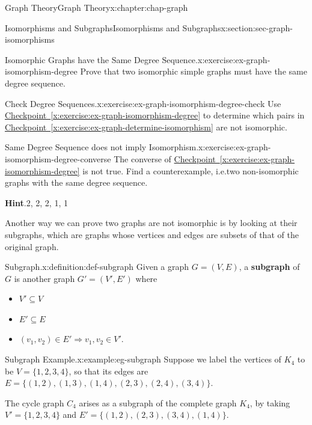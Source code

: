 \documentclass[oneside,10pt,]{book}
\newcommand{\blocktitlefont}{\relax}
\newcommand{\xreffont}{\relax}
\newcommand{\terminology}[1]{\textbf{#1}}
\numberwithin{equation}{section}
\begin{document}
\begin{chapterptx}{Graph Theory}{}{Graph Theory}{}{}{x:chapter:chap-graph}
\begin{sectionptx}{Isomorphisms and Subgraphs}{}{Isomorphisms and Subgraphs}{}{}{x:section:sec-graph-isomorphisms}
\begin{inlineexercise}{Isomorphic Graphs have the Same Degree Sequence.}{x:exercise:ex-graph-isomorphism-degree}
Prove that two isomorphic simple graphs must have the same degree sequence.%
\end{inlineexercise}
\begin{inlineexercise}{Check Degree Sequences.}{x:exercise:ex-graph-isomorphism-degree-check}%
Use \hyperref[x:exercise:ex-graph-isomorphism-degree]{Checkpoint~{\xreffont\ref{x:exercise:ex-graph-isomorphism-degree}}} to determine which pairs in \hyperref[x:exercise:ex-graph-determine-isomorphism]{Checkpoint~{\xreffont\ref{x:exercise:ex-graph-determine-isomorphism}}} are not isomorphic.%
\end{inlineexercise}
\begin{inlineexercise}{Same Degree Sequence does not imply Isomorphism.}{x:exercise:ex-graph-isomorphism-degree-converse}%
The converse of \hyperref[x:exercise:ex-graph-isomorphism-degree]{Checkpoint~{\xreffont\ref{x:exercise:ex-graph-isomorphism-degree}}} is not true. Find a counterexample, i.e.\@ two non-isomorphic graphs with the same degree sequence.%
\par\smallskip%
\noindent\textbf{\blocktitlefont Hint}.\hypertarget{g:hint:id490080}{}\quad{}2, 2, 2, 1, 1%
\end{inlineexercise}
Another way we can prove two graphs are not isomorphic is by looking at their subgraphs, which are graphs whose vertices and edges are subsets of that of the original graph.%
\begin{definition}{Subgraph.}{x:definition:def-subgraph}%
Given a graph \(G = (V,E)\), a \terminology{subgraph} of \(G\) is another graph \(G' = (V', E')\) where%
\begin{itemize}[label=\textbullet]
\item{}\(\displaystyle V' \subseteq V\)%
\item{}\(\displaystyle E' \subseteq E\)%
\item{}\((v_1,v_2) \in E' \Rightarrow v_1,v_2 \in V'\).%
\end{itemize}
%
\end{definition}
\begin{example}{Subgraph Example.}{x:example:eg-subgraph}%
Suppose we label the vertices of \(K_4\) to be \(V = \{1,2,3,4\}\), so that its edges are \(E = \{(1,2),(1,3),(1,4),(2,3),(2,4),(3,4)\}\).%
\par
The cycle graph \(C_4\) arises as a subgraph of the complete graph \(K_4\), by taking \(V' = \{1,2,3,4\}\) and \(E' = \{(1,2),(2,3),(3,4),(1,4)\}\).%
\begin{sidebyside}{1}{0.375}{0.375}{0}%
\begin{sbspanel}{0.25}%

\end{sbspanel}
\end{sidebyside}
\end{example}
\end{sectionptx}
\end{chapterptx}
\end{document}
